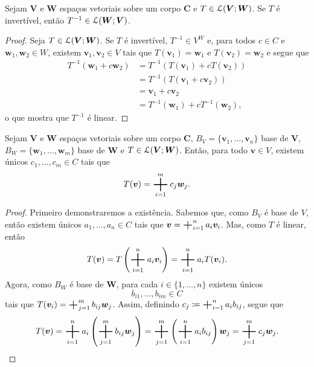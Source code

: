 \begin{prop}
	Sejam $\bm V$ e $\bm W$ espaços vetoriais sobre um corpo $\bm C$ e $T \in \mathcal{L}(\bm V;\bm W)$. Se $T$ é invertível, então $T^{-1} \in \mathcal{L}(\bm W;\bm V)$.
\end{prop}
\begin{proof}
	Seja $T \in \mathcal{L}(\bm V;\bm W)$. Se $T$ é invertível, $T^{-1} \in V^W$ e, para todos $c \in C$ e $\bm w_1,\bm w_2 \in W$, existem $\bm v_1,\bm v_2 \in V$ tais que $T(\bm v_1)=\bm w_1$ e $T(\bm v_2)=\bm w_2$ e segue que
	\begin{align*}
	T^{-1}(\bm w_1+c\bm w_2)&=T^{-1}(T(\bm v_1)+cT(\bm v_2)) \\
	&= T^{-1}(T(\bm v_1+c\bm v_2)) \\
	&= \bm v_1+c\bm v_2 \\
	&= T^{-1}(\bm w_1)+cT^{-1}(\bm w_2),
	\end{align*}
o que mostra que $T^{-1}$ é linear.
\end{proof}

\begin{prop}
	Sejam $\bm V$ e $\bm W$ espaços vetoriais sobre um corpo $\bm C$, $B_V=\{\bm v_1,\ldots,\bm v_n\}$ base de $\bm V$, $B_W=\{\bm w_1,\ldots,\bm w_m\}$ base de $\bm W$ e $T \in \mathcal{L}(\bm V;\bm W)$. Então, para todo $\bm v \in V$, existem únicos $c_1,\ldots,c_m \in C$ tais que
	\begin{equation*}
	T(\bm v) = \bigplus_{i=1}^m c_j \bm w_j.
	\end{equation*}
\end{prop}
\begin{proof}
	Primeiro demonstraremos a existência. Sabemos que, como $B_V$ é base de $V$, então existem únicos $a_1,\ldots,a_n \in C$ tais que $\bm v = \bigplus_{i=1}^n a_i\bm v_i$. Mas, como $T$ é linear, então
	\begin{equation*}
	T(\bm v) = T\left( \bigplus_{i=1}^n a_i \bm v_i \right) = \bigplus_{i=1}^n a_i T(\bm v_i).
	\end{equation*}
	Agora, como $B_W$ é base de $\bm W$, para cada $i \in \{1,\ldots,n\}$ existem únicos
	\begin{equation*}
	b_{i1},\ldots,b_{im} \in C
	\end{equation*}
tais que  $T(\bm v_i)=\bigplus_{j=1}^m b_{ij} \bm w_j$. Assim, definindo $c_j \coloneqq \bigplus_{i=1}^n a_i b_{ij}$, segue que
	\begin{equation*}
	T(\bm v)=\bigplus_{i=1}^n a_i \left(\bigplus_{j=1}^m b_{ij} \bm w_j \right) = \bigplus_{j=1}^m \left(\bigplus_{i=1}^n a_i b_{ij}\right) \bm w_j = \bigplus_{j=1}^m c_j \bm w_j.
	\end{equation*}

\end{proof}

